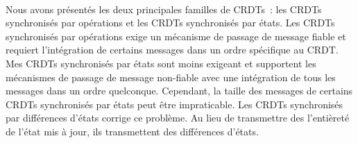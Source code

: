 \paragraph{} Nous avons présentés les deux principales familles de \acp{CRDT}~: les \acp{CRDT} synchronisés par opérations et les \acp{CRDT} synchronisés par états.
Les \acp{CRDT} synchronisés par opérations exige un mécanisme de passage de message fiable et requiert l'intégration de certains messages dans un ordre spécifique au \ac{CRDT}.
Mes \acp{CRDT} synchronisés par états sont moins exigeant et supportent les mécanismes de passage de message non-fiable avec une intégration de tous les messages dans un ordre quelconque.
Cependant, la taille des messages de certains \acp{CRDT} synchronisés par états peut être impraticable.
Les \acp{CRDT} synchronisés par différences d'états corrige ce problème.
Au lieu de transmettre des l'entièreté de l'état mis à jour, ils transmettent des différences d'états.
